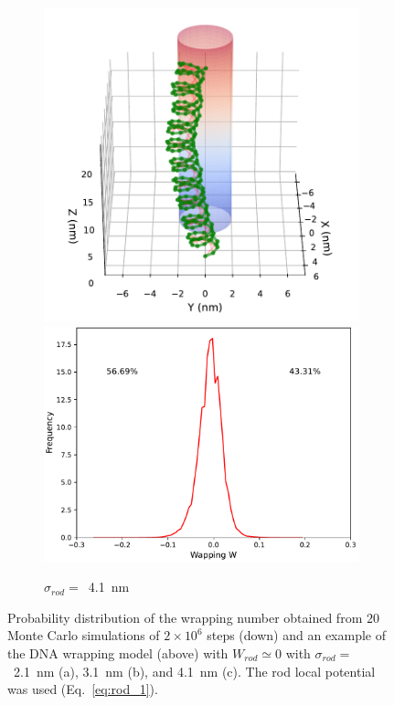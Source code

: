 \documentclass[a4paper,10pt]{article}
\begin{document}
\begin{figure}[tb]
\begin{subfigure}{.3\textwidth}
\includegraphics[width=\textwidth]{r1_C_2000000_7.pdf}
\includegraphics[width=\textwidth]{r1_C_wr_pr.pdf}
\caption{$\sigma_{rod}=$~\SI{4.1}{\nm}}
\label{fig:r1_c}
\end{subfigure}
\caption{Probability distribution of the wrapping number obtained from $20$ Monte Carlo simulations of $2\times 10^6$ steps (down) and an example of the DNA wrapping model (above) with $W_{rod}\simeq 0$ with $\sigma_{rod}=$~\SI{2.1}{\nm} (a), \SI{3.1}{\nm} (b), and \SI{4.1}{\nm} (c). The rod local potential was used (Eq.~\ref{eq:rod_1}).}
\label{fig:r1}
\end{figure}
\end{document}
